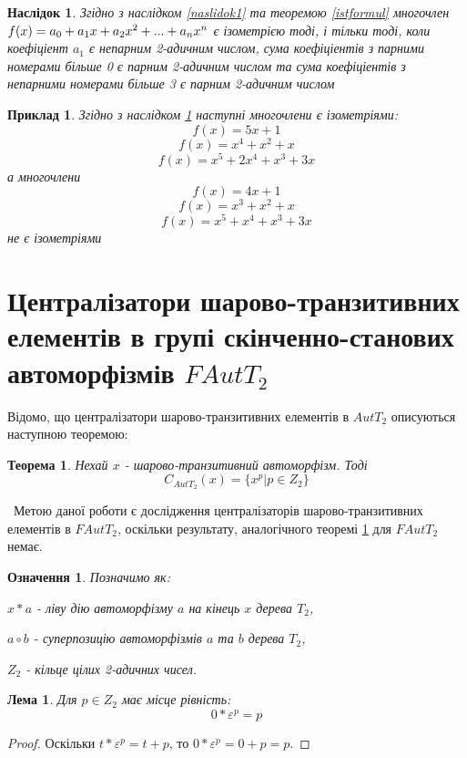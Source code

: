 \documentclass[a4paper,12pt]{article} \usepackage{a4wide}
\newcommand*{\hm}[1]{#1\nobreak\discretionary{}%
  {\hbox{$\mathsurround=0pt #1$}}{}} \newcommand{\bb}[1]{{\bf #1}}
\numberwithin{equation}{subsection}
\newtheorem{theorem}{Теорема}[subsection]
\newtheorem{lemma}{Лема}[subsection]
\newtheorem{corollary}{Наслідок}[subsection]
\newtheorem{definition}{Означення}[subsection]
\newtheorem{example}{Приклад}[subsection]
\begin{document}
\begin{corollary}\label{naslidok2} Згідно з наслідком \ref{naslidok1}
  та теоремою \ref{istformul} многочлен
  $f(x)=a_0\hm+a_1x\hm+a_2x^2\hm+...\hm+a_nx^n$ є ізометрією тоді, і
  тільки тоді, коли коефіціент $a_1$ є непарним 2-адичним числом, сума
  коефіціентів з парними номерами більше 0 є парним 2-адичним числом
  та сума коефіціентів з непарними номерами більше 3 є парним
  2-адичним числом
\end{corollary}
\begin{example}
  Згідно з наслідком \ref{naslidok2} наступні многочлени є
  ізометріями: $$f(x)=5x+1$$ $$f(x)=x^4+x^2+x$$ $$f(x)=x^5+2x^4+x^3+3x $$
  а
  многочлени $$f(x)=4x+1$$ $$f(x)=x^3+x^2+x$$ $$f(x)=x^5+x^4+x^3+3x $$
  не є ізометріями
\end{example}
\newpage




 \section{Централізатори шарово-транзитивних елементів в групі скінченно-станових автоморфізмів $FAutT_2$}
 Відомо, що централізатори шарово-транзитивних елементів в $AutT_2$
 описуються наступною теоремою:
 \begin{theorem}\label{SPTR_centralizer}
   Нехай $x$ - шарово-транзитивний автоморфізм. Тоді
 $$C_{AutT_2}(x)=\{x^p|p\in Z_2\} $$
 \end{theorem}
 \ Метою даної роботи є дослідження централізаторів
 шарово-транзитивних елементів в $FAutT_2$, оскільки результату,
 аналогічного теоремі \ref{SPTR_centralizer} для $FAutT_2$ немає.

\begin{definition}
  Позначимо як: 

  $x*a$ - ліву дію автоморфізму $a$ на кінець $x$ дерева $T_2$,

  $a\circ b$ - суперпозицію автоморфізмів $a$ та $b$ дерева $T_2$,

  $Z_2$ - кільце цілих 2-адичних чисел.
\end{definition}

\begin{lemma}\label{nul_epsilon}
  Для $p\in Z_2$ має місце рівність:
   $$0*\varepsilon^p=p$$
 \end{lemma}
 \begin{proof}
   Оскільки $t*\varepsilon^p = t+p$, то $0*\varepsilon^p = 0+p = p $.
 \end{proof}
\end{document}
